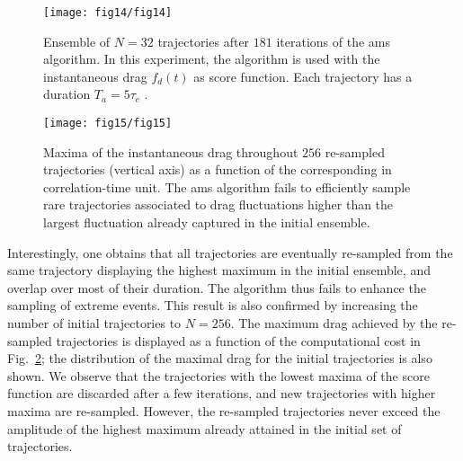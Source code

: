 
\begin{figure}
	\centering
	\texttt{[image: fig14/fig14]}
	\caption{\label{fig:AMS_drag_trajectories} Ensemble of $N = 32$ trajectories after $181$ iterations of the \ac{ams} algorithm. In this experiment, the algorithm is used with the instantaneous drag $f_d(t)$ as score function. Each trajectory has a duration $T_a = 5\tau_c$ .}
\end{figure}

\begin{figure}
	\centering
	\texttt{[image: fig15/fig15]}
	\caption{\label{fig:AMS_drag_resampling} Maxima of the instantaneous drag throughout $256$ re-sampled trajectories (vertical axis) as a function of the corresponding  in correlation-time unit. The \ac{ams} algorithm fails to efficiently sample rare trajectories associated to drag fluctuations higher than the largest fluctuation already captured in the initial ensemble.}
\end{figure}

%
%
Interestingly, one obtains that all trajectories are eventually re-sampled from the same trajectory displaying the highest maximum in the initial ensemble, and overlap over most of their duration.
%
The algorithm thus fails to enhance the sampling of extreme events. 
This result is also confirmed by increasing the number of initial trajectories to $N=256$.
%
The maximum drag achieved by the re-sampled trajectories is displayed as a function of the computational cost in Fig.~\ref{fig:AMS_drag_resampling};  
%
%
the distribution of the maximal drag for the {initial} trajectories is also shown.
We observe that the trajectories with the lowest maxima of the score function are discarded after a few iterations, and new trajectories with higher maxima are re-sampled. 
However, the re-sampled trajectories never exceed the amplitude of the highest maximum already attained in the initial set of trajectories. 
%

